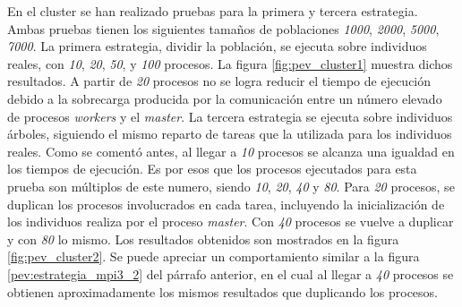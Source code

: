 	
	
	
		En el cluster se han realizado pruebas para la primera y tercera estrategia. Ambas pruebas tienen los siguientes tamaños de poblaciones \textit{1000}, \textit{2000}, \textit{5000}, \textit{7000}. La primera estrategia, dividir la población, se ejecuta sobre individuos reales, con \textit{10}, \textit{20}, \textit{50}, y \textit{100} procesos. La figura \ref{fig:pev_cluster1} muestra dichos resultados. A partir de \textit{20} procesos no se logra reducir el tiempo de ejecución debido a la sobrecarga producida por la comunicación entre un número elevado de procesos \textit{workers} y el \textit{master}. La tercera estrategia se ejecuta sobre individuos árboles, siguiendo el mismo reparto de tareas que la utilizada para los individuos reales. Como se comentó antes, al llegar a \textit{10} procesos se alcanza una igualdad en los tiempos de ejecución. Es por esos que los procesos ejecutados para esta prueba son múltiplos de este numero, siendo \textit{10}, \textit{20}, \textit{40} y \textit{80}. Para \textit{20} procesos, se duplican los procesos involucrados en cada tarea, incluyendo la inicialización de los individuos realiza por el proceso \textit{master}. Con \textit{40} procesos se vuelve a duplicar y con \textit{80} lo mismo. Los resultados obtenidos son mostrados en la figura \ref{fig:pev_cluster2}. Se puede apreciar un comportamiento similar a la figura \ref{pev:estrategia_mpi3_2} del párrafo anterior, en el cual al llegar a \textit{40} procesos se obtienen aproximadamente los mismos resultados que duplicando los procesos.
	
	
	
